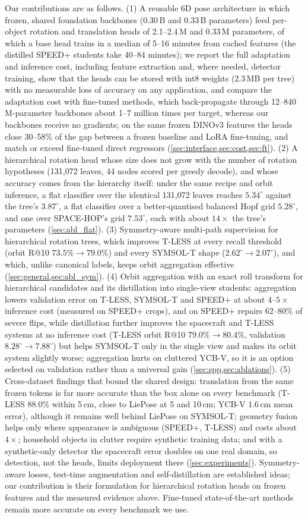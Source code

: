 Our contributions are as follows. (1) A reusable 6D pose architecture in which frozen, shared foundation backbones (0.30\,B and 0.33\,B parameters) feed per-object rotation and translation heads of 2.1--2.4\,M and 0.33\,M parameters, of which a base head trains in a median of 5--16 minutes from cached features (the distilled SPEED+ students take 40--84 minutes); we report the full adaptation and inference cost, including feature extraction and, where needed, detector training, show that the heads can be stored with int8 weights (2.3\,MB per tree) with no measurable loss of accuracy on any application, and compare the adaptation cost with fine-tuned methods, which back-propagate through 12--840\,M-parameter backbones about 1--7 million times per target, whereas our backbones receive no gradients; on the same frozen DINOv3 features the heads close 30--58\% of the gap between a frozen baseline and LoRA fine-tuning, and match or exceed fine-tuned direct regressors (\cref{sec:interface,sec:cost,sec:ft}). (2) A hierarchical rotation head whose size does not grow with the number of rotation hypotheses (131,072 leaves, 44 nodes scored per greedy decode), and whose accuracy comes from the hierarchy itself: under the same recipe and orbit inference, a flat classifier over the identical 131,072 leaves reaches $5.34^\circ$ against the tree's $3.87^\circ$, a flat classifier over a better-quantised balanced Hopf grid $5.28^\circ$, and one over SPACE-HOP's grid $7.53^\circ$, each with about $14\times$ the tree's parameters (\cref{sec:abl_flat}). (3) Symmetry-aware multi-path supervision for hierarchical rotation trees, which improves T-LESS at every recall threshold (orbit R@10 $73.5\%\to79.0\%$) and every SYMSOL-T shape ($2.62^\circ\to2.07^\circ$), and which, unlike canonical labels, keeps orbit aggregation effective (\cref{sec:general,sec:abl_sym}). (4) Orbit aggregation with an exact roll transform for hierarchical candidates and its distillation into single-view students: aggregation lowers validation error on T-LESS, SYMSOL-T and SPEED+ at about $4\text{--}5\times$ inference cost (measured on SPEED+ crops), and on SPEED+ repairs 62--80\% of severe flips, while distillation further improves the spacecraft and T-LESS systems at no inference cost (T-LESS orbit R@10 $79.0\%\to80.4\%$, validation $8.28^\circ\to7.88^\circ$) but helps SYMSOL-T only in the single view and makes its orbit system slightly worse; aggregation hurts on cluttered YCB-V, so it is an option selected on validation rather than a universal gain (\cref{sec:spp,sec:ablations}). (5) Cross-dataset findings that bound the shared design: translation from the same frozen tokens is far more accurate than the box alone on every benchmark (T-LESS 88.0\% within 5\,cm, close to LiePose at 5 and 10\,cm; YCB-V 1.6\,cm mean error), although it remains well behind LiePose on SYMSOL-T; geometry fusion helps only where appearance is ambiguous (SPEED+, T-LESS) and costs about $4\times$; household objects in clutter require synthetic training data; and with a synthetic-only detector the spacecraft error doubles on one real domain, so detection, not the heads, limits deployment there (\cref{sec:experiments}). Symmetry-aware losses, test-time augmentation and self-distillation are established ideas; our contribution is their formulation for hierarchical rotation heads on frozen features and the measured evidence above. Fine-tuned state-of-the-art methods remain more accurate on every benchmark we use.
